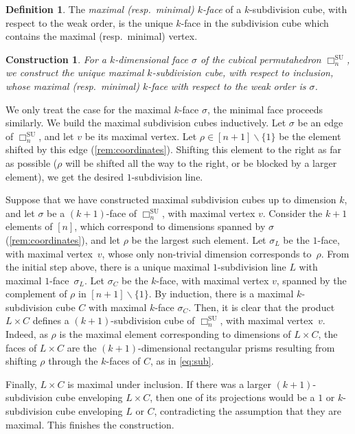 \documentclass{amsart}
\newcommand{\darkblue}{\color{darkblue}} %
\newtheorem{construction}[theorem]{Construction}
\theoremstyle{definition}
\newtheorem{definition}[theorem]{Definition}
\newcommand{\ssm}{\smallsetminus} %
\newcommand{\resp}{resp.~} %
\newcommand{\defn}[1]{\textsl{\darkblue #1}} %
\newcommand{\SU}{\mathrm{SU}}
\newcommand{\divcube}[1]{\Box_{#1}}
\begin{document}
\begin{definition}
	The \defn{maximal (\resp minimal) $k$-face} of a $k$-subdivision cube, with respect to the weak order, is the unique $k$-face in the subdivision cube which contains the maximal (\resp minimal) vertex.
\end{definition}

\begin{construction}
\label{const:unique-sub-cube}
For a $k$-dimensional face $\sigma$ of the cubical permutahedron $\divcube{n}^\SU$, we construct the unique maximal $k$-subdivision cube, with respect to inclusion, whose maximal (\resp minimal) $k$-face with respect to the weak order is $\sigma$.
\end{construction}

We only treat the case for the maximal $k$-face $\sigma$, the minimal face proceeds similarly.
We build the maximal subdivision cubes inductively.  
Let $\sigma$ be an edge of $\divcube{n}^\SU$, and let $v$ be its maximal vertex.
Let $\rho \in [n+1]\ssm\{1\}$ be the element shifted by this edge (\cref{rem:coordinates}).
Shifting this element to the right as far as possible ($\rho$ will be shifted all the way to the right, or be blocked by a larger element), we get the desired $1$-subdivision line.

Suppose that we have constructed maximal subdivision cubes up to dimension $k$, and let $\sigma$ be a $(k+1)$-face of $\divcube{n}^\SU$, with maximal vertex $v$.
Consider the $k+1$ elements of $[n]$, which correspond to dimensions spanned by $\sigma$ (\cref{rem:coordinates}), and let $\rho$ be the largest such element.
Let $\sigma_L$ be the $1$-face, with maximal vertex~$v$, whose only non-trivial dimension corresponds to~$\rho$.
From the initial step above, there is a unique maximal $1$-subdivision line $L$ with maximal $1$-face~$\sigma_L$.
Let $\sigma_C$ be the $k$-face, with maximal vertex $v$, spanned by the complement of $\rho$ in $[n+1] \ssm \{1\}$. 
By induction, there is a maximal $k$-subdivision cube $C$ with maximal $k$-face $\sigma_C$. 
Then, it is clear that the product $L\times C$ defines a $(k+1)$-subdivision cube of $\divcube{n}^\SU$, with maximal vertex~$v$. 
Indeed, as $\rho$ is the maximal element corresponding to dimensions of $L\times C$, the faces of $L\times C$ are the $(k+1)$-dimensional rectangular prisms resulting from shifting $\rho$ through the $k$-faces of $C$, as in \cref{eq:sub}.

Finally, $L\times C$ is maximal under inclusion.
If there was a larger $(k+1)$-subdivision cube enveloping $L\times C$, then one of its projections would be a $1$ or $k$-subdivision cube enveloping $L$ or $C$, contradicting the assumption that they are maximal.
This finishes the construction. 
\end{document}
